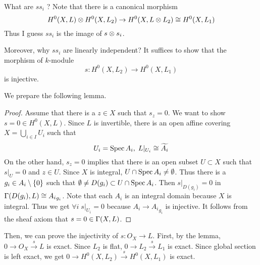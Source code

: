 \begin{rem}
  What are $s s_i$ ? Note that there is a canonical morphism
  \[
  H^0(X,L) \otimes H^0(X,L_2) \to H^0(X,L \otimes L_2) \cong H^0(X,L_1)
  \]
  Thus I guess $s s_i$ is the image of $s \otimes s_i$.

  Moreover, why $s s_i$ are linearly independent? It suffices to show that the morphism of $k$-module
  \[
  s \colon H^0(X,L_2) \to H^0(X,L_1)
  \]
  is injective.

  We prepare the following lemma.
  \begin{proof}
    Assume that there is a $z \in X$ such that $s_z = 0$. We want to show $s = 0 \in H^0(X,L)$. Since  $L$ is invertible, there is an open affine covering $X = \bigcup_{i \in I} U_i$ such that
    \[
    U_i = \operatorname{Spec} A_i , \; L|_{U_i} \cong \widetilde{A_i}
    \]
    On the other hand, $s_z = 0$ implies that there is an open subset $U \subset X$ such that $s|_U = 0$ and $z \in U$. Since $X$ is integral, $U \cap \operatorname{Spec} A_i \neq \emptyset$. Thus there is a $g_i \in A_i \setminus \{ 0 \}$ such that $\emptyset \neq D(g_i) \subset U \cap \operatorname{Spec} A_i$. Then $s|_{D(g_i)} = 0$ in ${\Gamma}(D(g_i), L) \cong {A_i}_{g_i}$.
    Note that each $A_i$ is an integral domain because $X$ is integral. Thus we get $\forall i \; s|_{U_i}=0$ because $A_i \to {A_i}_{g_i}$ is injective. It follows from the sheaf axiom that $s=0 \in {\Gamma}(X,L)$.
  \end{proof}

  Then, we can prove the injectivity of $s \colon O_X \to L$. First, by the lemma, $0 \to O_X \xrightarrow{s} L$ is exact. Since $L_2$ is flat, $0 \to L_2 \xrightarrow{s} L_1$ is exact. Since global section is left exact, we get $0 \to H^0(X,L_2) \xrightarrow{s} H^0(X,L_1)$ is exact.
\end{rem}




